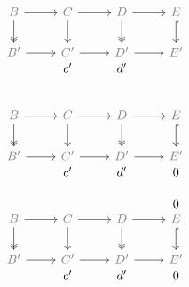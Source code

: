 \documentclass[12pt]{article}
\begin{document}
\begin{equation*}
  \begin{tikzcd}
    &\phantom{c}&\phantom{d}&\phantom{0}\\[-2em]
    \color{gray}B\rar\dar[two heads] & \color{gray}C\rar\dar & \color{gray}D\rar\dar[two heads] & \color{gray}E\dar[hook] \\
    \color{gray}B'\rar &\color{gray} C'\rar &\color{gray} D'\rar &\color{gray} E' \\[-2em]
    & c' & d'
  \end{tikzcd}
\end{equation*}

\begin{equation*}
  \begin{tikzcd}
    &\phantom{c}&\phantom{d}&\phantom{0}\\[-2em]
    \color{gray}B\rar\dar[two heads] & \color{gray}C\rar\dar & \color{gray}D\rar\dar[two heads] & \color{gray}E\dar[hook] \\
    \color{gray}B'\rar &\color{gray} C'\rar &\color{gray} D'\rar &\color{gray} E' \\[-2em]
    & c' & d' & 0
  \end{tikzcd}
\end{equation*}

\begin{equation*}
  \begin{tikzcd}
    &\phantom{c} &\phantom{d} & 0 \\[-2em]
    \color{gray}B\rar\dar[two heads] & \color{gray}C\rar\dar & \color{gray}D\rar\dar[two heads] & \color{gray}E\dar[hook, black] \\
    \color{gray}B'\rar &\color{gray} C'\rar &\color{gray} D'\rar &\color{gray} E' \\[-2em]
    & c' & d' & 0
  \end{tikzcd}
\end{equation*}
\end{document}

